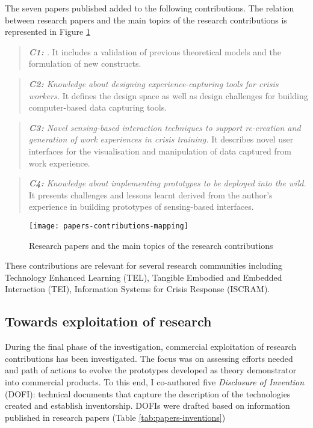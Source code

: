 The seven papers published added to the following contributions. The relation between research papers and the main topics of the research contributions is represented in Figure \ref{fig:mapping}
\begin{quote}
	\emph{\textbf{C1:} \Ci.} It includes a validation of previous theoretical models and the formulation of new constructs. 
\end{quote}
\begin{quote}
	\emph{\textbf{C2:} Knowledge about designing experience-capturing tools for crisis workers.} It defines the design space as well as design challenges for building computer-based data capturing tools. 
\end{quote}
\begin{quote}
	\emph{\textbf{C3:} Novel sensing-based interaction techniques to support re-creation and generation of work experiences in crisis training.} It describes novel user interfaces for the visualisation and manipulation of data captured from work experience. 
\end{quote}
\begin{quote}
	\emph{\textbf{C4:} Knowledge about implementing prototypes to be deployed into the wild.} It presents challenges and lessons learnt derived from the author's experience in building prototypes of sensing-based interfaces. 
\end{quote}
\begin{figure}
	[tb] \centering 
	\texttt{[image: papers-contributions-mapping]} \caption{Research papers and the main topics of the research contributions} \label{fig:mapping} 
\end{figure}

These contributions are relevant for several research communities including Technology Enhanced Learning (TEL), Tangible Embodied and Embedded Interaction (TEI), Information Systems for Crisis Response (ISCRAM).

\subsection{Towards exploitation of research}\label{exploitation-of-research-contributions}

During the final phase of the investigation, commercial exploitation of research contributions has been investigated. The focus was on assessing efforts needed and path of actions to evolve the prototypes developed as theory demonstrator into commercial products. To this end, I co-authored five \emph{Disclosure of Invention} (DOFI): technical documents that capture the description of the technologies created and establish inventorship. DOFIs were drafted based on information published in research papers (Table \ref{tab:papers-inventions})

